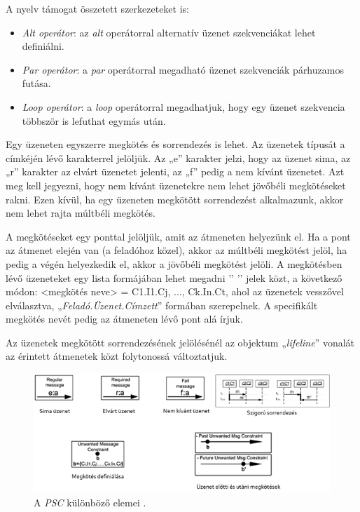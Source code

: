 A nyelv támogat összetett szerkezeteket is:

\begin{itemize}
    \item \textit{Alt operátor}: az \textit{alt} operátorral alternatív üzenet szekvenciákat lehet definiálni.
    \item \textit{Par operátor}: a \textit{par} operátorral megadható üzenet szekvenciák párhuzamos futása.
    \item \textit{Loop operátor}: a \textit{loop} operátorral megadhatjuk, hogy egy üzenet szekvencia többször is lefuthat egymás után.
\end{itemize}

Egy üzeneten egyszerre megkötés és sorrendezés is lehet.
Az üzenetek típusát a címkéjén lévő karakterrel jelöljük.
Az „e” karakter jelzi, hogy az üzenet sima, az „r” karakter az elvárt üzenetet jelenti, az „f” pedig a nem kívánt üzenetet.
Azt meg kell jegyezni, hogy nem kívánt üzenetekre nem lehet jövőbéli megkötéseket rakni.
Ezen kívül, ha egy üzeneten megkötött sorrendezést alkalmazunk, akkor nem lehet rajta múltbéli megkötés.

A megkötéseket egy ponttal jelöljük, amit az átmeneten helyezünk el.
Ha a pont az átmenet elején van (a feladóhoz közel), akkor az múltbéli megkötést jelöl, ha pedig a végén helyezkedik el, akkor a jövőbéli megkötést jelöli.
A megkötésben lévő üzeneteket egy lista formájában lehet megadni ’{’ ’}’ jelek közt, a következő módon: <megkötés neve> = {C1.I1.Cj, ..., Ck.In.Ct}, ahol az üzenetek vesszővel elválasztva, „\textit{Feladó.Üzenet.Címzett}” formában szerepelnek.
A specifikált megkötés nevét pedig az átmeneten lévő pont alá írjuk.

Az üzenetek megkötött sorrendezésének jelölésénél az objektum „\textit{lifeline}” vonalát az érintett átmenetek közt folytonossá változtatjuk.

\begin{figure}[!ht]
    \centering
    \includegraphics[width=150mm, keepaspectratio]{figures/2abra.png}
    \caption{A \textit{PSC} különböző elemei \cite{PSC1}.}
    \label{psc_elemek}
\end{figure}

